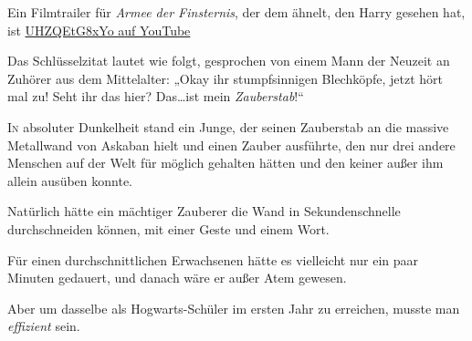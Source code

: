 
\begin{chapterOpeningAuthorNote}
Ein Filmtrailer für \emph{Armee der Finsternis}, der dem ähnelt, den Harry gesehen hat, ist \href{https://www.youtube.com/watch?v=UHZQEtG8xYo}{UHZQEtG8xYo auf YouTube}

Das Schlüsselzitat lautet wie folgt, gesprochen von einem Mann der Neuzeit an Zuhörer aus dem Mittelalter:
„Okay ihr stumpfsinnigen Blechköpfe, jetzt hört mal zu! Seht ihr das hier? Das…ist mein \emph{Zauberstab}!“%
\end{chapterOpeningAuthorNote}

\lettrine{I}{n} absoluter Dunkelheit stand ein Junge, der seinen Zauberstab an die massive Metallwand von Askaban hielt und einen Zauber ausführte, den nur drei andere Menschen auf der Welt für möglich gehalten hätten und den keiner außer ihm allein ausüben konnte.

Natürlich hätte ein mächtiger Zauberer die Wand in Sekundenschnelle durchschneiden können, mit einer Geste und einem Wort.

Für einen durchschnittlichen Erwachsenen hätte es vielleicht nur ein paar Minuten gedauert, und danach wäre er außer Atem gewesen.

Aber um dasselbe als Hogwarts-Schüler im ersten Jahr zu erreichen, musste man \emph{effizient} sein.

